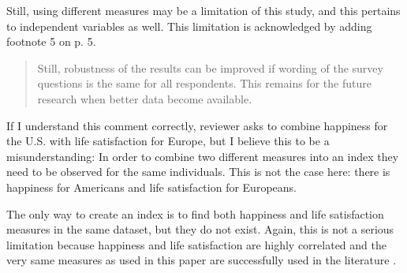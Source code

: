 \noindent Still, using different measures may be a limitation of this study, and this pertains to
independent variables as well. This limitation is acknowledged by adding  
footnote 5 on p. 5.

\begin{quote}
 Still, robustness of the results can be improved if wording of the survey
 questions is the same for all respondents. This remains for the future research when better data
 become available.
\end{quote}



 If I understand this comment correctly, reviewer asks to combine happiness for the
U.S. with life satisfaction for Europe, but I believe this to be a misunderstanding: In order to
combine two different  measures into an index they need to be observed for the same
 individuals. This is not the case here: there is happiness for Americans and life satisfaction for Europeans.

\noindent The only way to create an index is to find both happiness and life satisfaction measures in the same
dataset, but they do not
exist. Again, this is not a serious limitation because happiness and life satisfaction
are highly correlated and the very same measures as used in this paper are successfully used in the
literature  \citep{alesina03, stevenson09w}.

